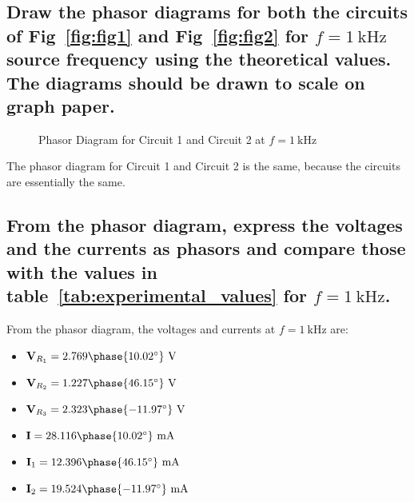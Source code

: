 \documentclass[12pt]{article}
\begin{document}
\begin{large}
	\subsection{Draw the phasor diagrams for both the circuits of Fig~\ref{fig:fig1} and Fig~\ref{fig:fig2} for $ f = \SI{1}{\kilo\hertz} $ source frequency using the theoretical values. The diagrams should be drawn to scale on graph paper.}
	\begin{figure}[H]
		\centering
		\caption{Phasor Diagram for Circuit 1 and Circuit 2 at $ f = \SI{1}{\kilo\hertz} $}
		\label{fig:phasor_diagram1}
	\end{figure}
	The phasor diagram for Circuit 1 and Circuit 2 is the same, because the circuits are essentially the same.

	\subsection{From the phasor diagram, express the voltages and the currents as phasors and compare those with the values in table~\ref{tab:experimental_values} for $ f = \SI{1}{\kilo\hertz} $.}
	From the phasor diagram, the voltages and currents at $ f = \SI{1}{\kilo\hertz} $ are:

	\begin{itemize}
		\item $ \mathbf{V}_{R_1} = 2.769\phase{10.02^\circ}~\SI{}{\V} $
		\item $ \mathbf{V}_{R_2} = 1.227\phase{46.15^\circ}~\SI{}{\V} $
		\item $ \mathbf{V}_{R_3} = 2.323\phase{-11.97^\circ}~\SI{}{\V} $
		\item $ \mathbf{I} = 28.116\phase{10.02^\circ}~\SI{}{\milli\A} $
		\item $ \mathbf{I}_1 = 12.396\phase{46.15^\circ}~\SI{}{\milli\A} $
		\item $ \mathbf{I}_2 = 19.524\phase{-11.97^\circ}~\SI{}{\milli\A} $
	\end{itemize}


\end{large}
\end{document}
